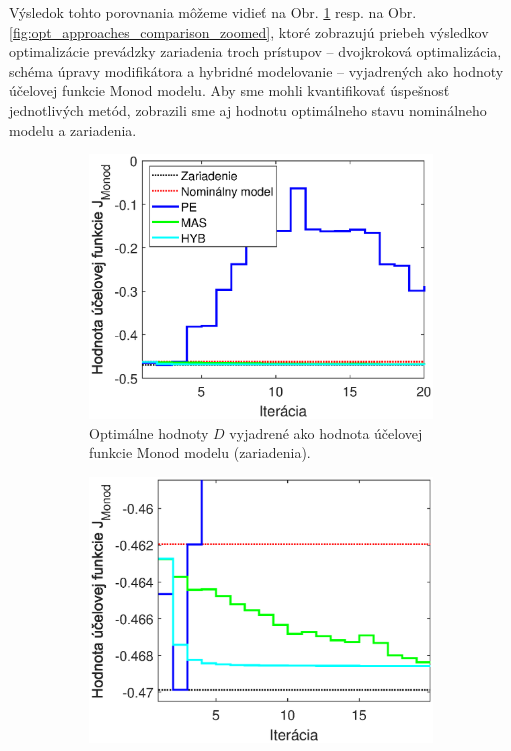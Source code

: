Výsledok tohto porovnania môžeme vidieť na Obr. \ref{fig:opt_approaches_comparison} resp. na Obr. \ref{fig:opt_approaches_comparison_zoomed}, ktoré zobrazujú priebeh výsledkov optimalizácie prevádzky zariadenia troch prístupov -- dvojkroková optimalizácia, schéma úpravy modifikátora a hybridné modelovanie -- vyjadrených ako hodnoty účelovej funkcie Monod modelu. Aby sme mohli kvantifikovať úspešnosť jednotlivých metód, zobrazili sme aj hodnotu optimálneho stavu nominálneho modelu a zariadenia.
\begin{figure}
	\centering
	\begin{subfigure}[b]{0.49\textwidth}
		\centering
		\includegraphics[width=\linewidth]{images/opt_approaches_comparison}
		\caption{Optimálne hodnoty $ D $ vyjadrené ako hodnota účelovej funkcie Monod modelu (zariadenia).}
		\label{fig:opt_approaches_comparison}
	\end{subfigure}
	\hfill
	\begin{subfigure}[b]{0.49\textwidth}
		\centering
		\includegraphics[width=\linewidth]{images/opt_approaches_comparison_zoomed}

\end{subfigure}
\end{figure}
